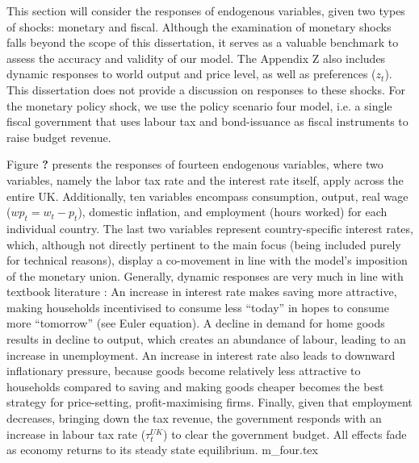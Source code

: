 This section will consider the responses of endogenous variables, given two types of shocks: monetary and fiscal. Although the examination of monetary shocks falls beyond the scope of this dissertation, it serves as a valuable benchmark to assess the accuracy and validity of our model. The Appendix Z also includes dynamic responses to world output and price level, as well as preferences ($z_t$). This dissertation does not provide a discussion on responses to these shocks. For the monetary policy shock, we use the policy scenario four model, i.e. a single fiscal government that uses labour tax and bond-issuance as fiscal instruments to raise budget revenue.

Figure \textbf{?} presents the responses of fourteen endogenous variables, where two variables, namely the labor tax rate and the interest rate itself, apply across the entire UK. Additionally, ten variables encompass consumption, output, real wage ($wp_t = w_t - p_t$), domestic inflation, and employment (hours worked) for each individual country. The last two variables represent country-specific interest rates, which, although not directly pertinent to the main focus (being included purely for technical reasons), display a co-movement in line with the model's imposition of the monetary union. Generally, dynamic responses are very much in line with textbook literature \textcolor{red}{\parencite{jordigal_2015_monetary}}: An increase in interest rate makes saving more attractive, making households incentivised to consume less ``today'' in hopes to consume more ``tomorrow'' (see Euler equation). A decline in demand for home goods results in decline to output, which creates an abundance of labour, leading to an increase in unemployment. An increase in interest rate also leads to downward inflationary pressure, because goods become relatively less attractive to households compared to saving and making goods cheaper becomes the best strategy for price-setting, profit-maximising firms. Finally, given that employment decreases, bringing down the tax revenue, the government responds with an increase in labour tax rate ($\tau^{UK}_t$) to clear the government budget. All effects fade as economy returns to its steady state equilibrium.
{m_four.tex}

